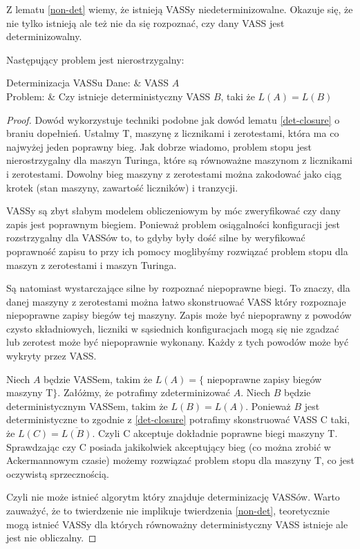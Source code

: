     Z lematu \ref{non-det} wiemy, że istnieją VASSy niedeterminizowalne.
    Okazuje się, że nie tylko istnieją ale też nie da się rozpoznać, czy dany VASS jest determinizowalny.

    \begin{theorem}
        \label{det-decidability}
        Następujący problem jest nierostrzygalny:
        \begin{problem}[]{Determinizacja VASSu}
            Dane: & VASS $A$\\
            Problem: & Czy istnieje deterministyczny VASS $B$, taki że $L(A) = L(B)$\\
        \end{problem}


    \end{theorem}

    \begin{proof}
        Dowód wykorzystuje techniki podobne jak dowód lematu \ref{det-closure} o braniu dopełnień.
        Ustalmy T, maszynę z licznikami i zerotestami, która ma co najwyżej jeden poprawny bieg.
        Jak dobrze wiadomo, problem stopu jest nierostrzygalny dla maszyn Turinga, które są równoważne maszynom z licznikami i zerotestami.
        Dowolny bieg maszyny z zerotestami można zakodować jako ciąg krotek (stan maszyny, zawartość liczników) i tranzycji.

        VASSy są zbyt słabym modelem obliczeniowym by móc zweryfikować czy dany zapis jest poprawnym biegiem.
        Ponieważ problem osiągalności konfiguracji jest rozstrzygalny dla VASSów to, to gdyby były dość silne
        by weryfikować poprawność zapisu to przy ich pomocy moglibyśmy rozwiązać problem stopu dla maszyn z zerotestami i maszyn Turinga.

        Są natomiast wystarczające silne by rozpoznać niepoprawne biegi.
        To znaczy, dla danej maszyny z zerotestami można łatwo skonstruować VASS który rozpoznaje niepoprawne zapisy biegów
        tej maszyny.
        Zapis może być niepoprawny z powodów czysto składniowych, liczniki w sąsiednich konfiguracjach mogą się nie zgadzać
        lub zerotest może być niepoprawnie wykonany.
        Każdy z tych powodów może być wykryty przez VASS.


        Niech $A$ będzie VASSem, takim że $L(A)=\{$ niepoprawne zapisy biegów maszyny T$\}$.
        Załóżmy, że potrafimy zdeterminizować $A$.
        Niech $B$ będzie deterministycznym VASSem, takim że $L(B)=L(A)$.
        Ponieważ $B$ jest deterministyczne to zgodnie z \ref{det-closure} potrafimy skonstruować VASS C taki, że $L(C) = \overline{L(B)}$.
        Czyli C akceptuje dokładnie poprawne biegi maszyny T.
        Sprawdzając czy C posiada jakikolwiek akceptujący bieg (co można zrobić w Ackermannowym czasie\cite{Ackermann-complete,Ackerman})
        możemy rozwiązać problem stopu dla maszyny T, co jest oczywistą sprzecznością.

        Czyli nie może istnieć algorytm który znajduje determinizację VASSów.
        Warto zauważyć, że to twierdzenie nie implikuje twierdzenia \ref{non-det}, teoretycznie mogą istnieć VASSy dla których
        równoważny deterministyczny VASS istnieje ale jest nie obliczalny.
    \end{proof}

